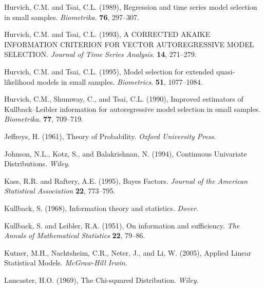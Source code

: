 \phantom{a}

\rff Hurvich, C.M. and Tsai, C.L. (1989),
      Regression and time series model selection in small samples.
      {\it Biometrika}.
      {\bf 76}, {297--307}.

\phantom{a}

\rff Hurvich, C.M. and Tsai, C.L. (1993),
      A CORRECTED AKAIKE INFORMATION CRITERION FOR VECTOR AUTOREGRESSIVE MODEL SELECTION.
      {\it Journal of Time Series Analysis}.
      {\bf 14}, {271--279}.

\phantom{a}

\rff Hurvich, C.M. and Tsai, C.L. (1995),
      Model selection for extended quasi-likelihood models in small samples.
      {\it Biometrics}.
      {\bf 51}, {1077--1084}.

\phantom{a}

\rff Hurvich, C.M., Shumway, C., and Tsai, C.L. (1990),
      Improved estimators of Kullback–Leibler information for autoregressive model selection in small samples.
      {\it Biometrika}.
      {\bf 77}, {709--719}.

\phantom{a}

\rff Jeffreys, H. (1961),
      Theory of Probability.
      {\it Oxford University Press}.

\phantom{a}

\rff Johnson, N.L., Kotz, S., and Balakrishnan, N. (1994),
      Continuous Univariate Distributions.
      {\it Wiley}.

\phantom{a}

\rff Kass, R.R. and Raftery, A.E. (1995),
     Bayes Factors.
     {\it Journal of the American Statistical Association}
     {\bf 22}, {773--795}.

\phantom{a}

\rff Kullback, S. (1968),
      Information theory and statistics.
      {\it Dover}.

\phantom{a}

\rff Kullback, S. and Leibler, R.A. (1951),
     On information and sufficiency.
     {\it The Annals of Mathematical Statistics}
     {\bf 22}, {79--86}.

\phantom{a}

\rff Kutner, M.H., Nachtsheim, C.R., Neter, J., and Li, W. (2005),
      Applied Linear Statistical Models.
      {\it McGraw-Hill Irwin}.

\phantom{a}

\rff Lancaster, H.O. (1969),
      The Chi-squared Distribution.
     {\it Wiley}.

